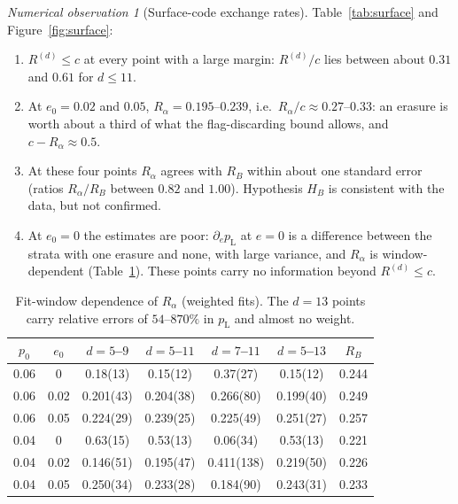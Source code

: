 \documentclass[11pt,a4paper]{article}
\theoremstyle{plain}
\theoremstyle{definition}
\theoremstyle{remark}
\newtheorem{observation}[theorem]{Numerical observation}
\newcommand{\pL}{p_{\mathrm{L}}}
\begin{document}
\begin{observation}[Surface-code exchange rates]\label{obs:surface}
Table~\ref{tab:surface} and Figure~\ref{fig:surface}:
\begin{enumerate}[label=(\alph*)]
\item $R^{(d)}\le c$ at every point with a large margin: $R^{(d)}/c$ lies between about $0.31$ and $0.61$ for $d\le11$.
\item At $e_0=0.02$ and $0.05$, $R_\alpha=0.195$--$0.239$, i.e.\ $R_\alpha/c\approx0.27$--$0.33$: an erasure is worth about a third of what the flag-discarding bound allows, and $c-R_\alpha\approx0.5$.
\item At these four points $R_\alpha$ agrees with $R_B$ within about one standard error (ratios $R_\alpha/R_B$ between $0.82$ and $1.00$). Hypothesis $H_B$ is consistent with the data, but not confirmed.
\item At $e_0=0$ the estimates are poor: $\partial_e\pL$ at $e=0$ is a difference between the strata with one erasure and none, with large variance, and $R_\alpha$ is window-dependent (Table~\ref{tab:window}). These points carry no information beyond $R^{(d)}\le c$.
\end{enumerate}
\end{observation}

\begin{table}[t]
\centering
\small
\begin{tabular}{ccccccc}
\toprule
$p_0$ & $e_0$ & $d=5$--$9$ & $d=5$--$11$ & $d=7$--$11$ & $d=5$--$13$ & $R_B$\\
\midrule
0.06 & 0    & 0.18(13) & 0.15(12) & 0.37(27) & 0.15(12) & 0.244\\
0.06 & 0.02 & 0.201(43) & 0.204(38) & 0.266(80) & 0.199(40) & 0.249\\
0.06 & 0.05 & 0.224(29) & 0.239(25) & 0.225(49) & 0.251(27) & 0.257\\
0.04 & 0    & 0.63(15) & 0.53(13) & 0.06(34) & 0.53(13) & 0.221\\
0.04 & 0.02 & 0.146(51) & 0.195(47) & 0.411(138) & 0.219(50) & 0.226\\
0.04 & 0.05 & 0.250(34) & 0.233(28) & 0.184(90) & 0.243(31) & 0.233\\
\bottomrule
\end{tabular}
\caption{Fit-window dependence of $R_\alpha$ (weighted fits). The $d=13$ points carry relative errors of $54$--$870\%$ in $\pL$ and almost no weight.}
\label{tab:window}
\end{table}
\end{document}
